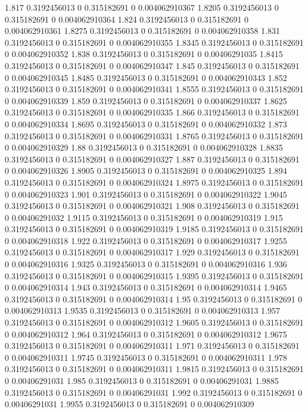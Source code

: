 {1.817 0.3192456013 0 0.315182691 0 0.004062910367
1.8205 0.3192456013 0 0.315182691 0 0.004062910364
1.824 0.3192456013 0 0.315182691 0 0.004062910361
1.8275 0.3192456013 0 0.315182691 0 0.004062910358
1.831 0.3192456013 0 0.315182691 0 0.004062910355
1.8345 0.3192456013 0 0.315182691 0 0.004062910352
1.838 0.3192456013 0 0.315182691 0 0.00406291035
1.8415 0.3192456013 0 0.315182691 0 0.004062910347
1.845 0.3192456013 0 0.315182691 0 0.004062910345
1.8485 0.3192456013 0 0.315182691 0 0.004062910343
1.852 0.3192456013 0 0.315182691 0 0.004062910341
1.8555 0.3192456013 0 0.315182691 0 0.004062910339
1.859 0.3192456013 0 0.315182691 0 0.004062910337
1.8625 0.3192456013 0 0.315182691 0 0.004062910335
1.866 0.3192456013 0 0.315182691 0 0.004062910334
1.8695 0.3192456013 0 0.315182691 0 0.004062910332
1.873 0.3192456013 0 0.315182691 0 0.004062910331
1.8765 0.3192456013 0 0.315182691 0 0.004062910329
1.88 0.3192456013 0 0.315182691 0 0.004062910328
1.8835 0.3192456013 0 0.315182691 0 0.004062910327
1.887 0.3192456013 0 0.315182691 0 0.004062910326
1.8905 0.3192456013 0 0.315182691 0 0.004062910325
1.894 0.3192456013 0 0.315182691 0 0.004062910324
1.8975 0.3192456013 0 0.315182691 0 0.004062910323
1.901 0.3192456013 0 0.315182691 0 0.004062910322
1.9045 0.3192456013 0 0.315182691 0 0.004062910321
1.908 0.3192456013 0 0.315182691 0 0.00406291032
1.9115 0.3192456013 0 0.315182691 0 0.004062910319
1.915 0.3192456013 0 0.315182691 0 0.004062910319
1.9185 0.3192456013 0 0.315182691 0 0.004062910318
1.922 0.3192456013 0 0.315182691 0 0.004062910317
1.9255 0.3192456013 0 0.315182691 0 0.004062910317
1.929 0.3192456013 0 0.315182691 0 0.004062910316
1.9325 0.3192456013 0 0.315182691 0 0.004062910316
1.936 0.3192456013 0 0.315182691 0 0.004062910315
1.9395 0.3192456013 0 0.315182691 0 0.004062910314
1.943 0.3192456013 0 0.315182691 0 0.004062910314
1.9465 0.3192456013 0 0.315182691 0 0.004062910314
1.95 0.3192456013 0 0.315182691 0 0.004062910313
1.9535 0.3192456013 0 0.315182691 0 0.004062910313
1.957 0.3192456013 0 0.315182691 0 0.004062910312
1.9605 0.3192456013 0 0.315182691 0 0.004062910312
1.964 0.3192456013 0 0.315182691 0 0.004062910312
1.9675 0.3192456013 0 0.315182691 0 0.004062910311
1.971 0.3192456013 0 0.315182691 0 0.004062910311
1.9745 0.3192456013 0 0.315182691 0 0.004062910311
1.978 0.3192456013 0 0.315182691 0 0.004062910311
1.9815 0.3192456013 0 0.315182691 0 0.00406291031
1.985 0.3192456013 0 0.315182691 0 0.00406291031
1.9885 0.3192456013 0 0.315182691 0 0.00406291031
1.992 0.3192456013 0 0.315182691 0 0.00406291031
1.9955 0.3192456013 0 0.315182691 0 0.004062910309
}
